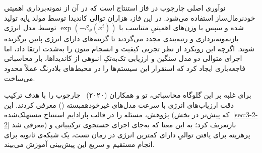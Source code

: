 نوآوری اصلی چارچوب  در فاز استنتاج است که در آن از نمونه‌برداری اهمیتی خودنرمال‌ساز استفاده می‌شود. در این فاز، هزاران توالی کاندیدا توسط مولد پایه تولید شده و سپس با وزن‌های اهمیتیِ متناسب با $\exp(-\mathcal{E}_\theta(x^i))$ توسط مدل انرژی بازنمونه‌برداری و رتبه‌بندی مجدد می‌گردند تا گزینه‌های دارای انرژی پایین برگزیده شوند. اگرچه این رویکرد از نظر تجربی کیفیت و انسجام متون را به‌شدت ارتقا داد، اما اجرای متوالی دو مدل سنگین و ارزیابی تک‌به‌تکِ انبوهی از کاندیداها، بار محاسباتی فاجعه‌باری ایجاد کرد که استقرار این سیستم‌ها را در محیط‌های بلادرنگ عملاً محدود می‌ساخت.

برای غلبه بر این گلوگاه محاسباتی، تو و همکاران (۲۰۲۰)~\cite{tu2020engine} چارچوب  را با هدف ترکیب دقت ارزیاب‌های انرژی با سرعت مدل‌های غیرخودهمبسته () معرفی کردند. این پژوهش، مسئله را در قالب پارادایم استنتاج مستهلک‌شده (که پیش‌تر در بخش~\ref{sec:3-2-2} معرفی شد) بازتعریف کرد؛ به این معنا که به‌جای اجرای جستجوی ترکیبیاتی و پرهزینه برای یافتن توالیِ دارای کمترین انرژی در زمان تست، یک شبکه‌ی ثانویه برای انجام مستقیم و سریع این پیش‌بینی آموزش می‌بیند.


